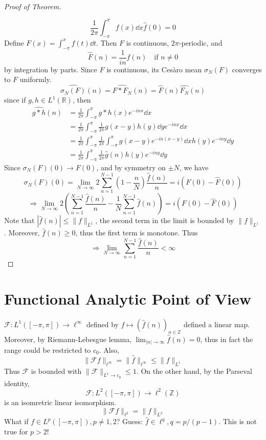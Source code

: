 \documentclass{article}
\theoremstyle{definition}
\newenvironment{proofs}[1][\proofname]{%
  \begin{proof}[#1]$ $\par\nobreak\ignorespaces
}{%
  \end{proof}
}
\newcommand{\F}{\mathcal F}
\newcommand{\RR}{\mathbb R}
\newcommand{\ZZ}{\mathbb Z}
\newcommand{\Ra}{\Rightarrow}
\begin{document}
\begin{proofs}[Proof of Theorem]
	\[
		\frac{1}{2 \pi} \int_{-\pi}^\pi f(x) \dd{x} \hat{f}(0) = 0
	\]
	Define $F(x) = \int_{-\pi}^x f(t) \dd{t}$.
	Then $F$ is continuous, $2 \pi$-periodic, and 
	\[
		\hat{F}(n) = \frac{1}{in} \hat{f}(n) \quad \text{if }n \neq 0
	\]
	by integration by parts.
	Since $F$ is continuous, its Ces\`aro mean $\sigma_N(F)$ converges to $F$ uniformly.
	\[
		\widehat{\sigma_N(F)}(n) = \widehat{F * F_N}(n) = \widehat{F}(n) \widehat{F_N}(n)
	\]
	since if $g, h \in L^1(\RR)$, then
	\[
		\begin{split}
			\widehat{g * h}(n) & = \frac{1}{2 \pi} \int_{- \pi}^\pi g * h(x) e^{-inx} \dd{x}\\
			& = \frac{1}{2 \pi} \int_{- \pi}^{\pi} \frac{1}{2 \pi} g(x - y) h(y) \dd{y} e^{-inx} \dd{x}\\
			& = \frac{1}{2 \pi} \int_{- \pi}^\pi \frac{1}{2 \pi} \int_{- \pi}^\pi g(x - y) e^{-in (x - y)} \dd{x} h(y) e^{-iny} \dd{y}\\
			& = \frac{1}{2 \pi} \int_{- \pi}^\pi \frac{1}{2 \pi} \widehat{g}(n) h(y) e^{- iny} \dd{y}
		\end{split}
	\]
	Since $\sigma_N(F)(0) \to F(0)$, and by symmetry on $\pm N$, we have
	\[
		\sigma_N(F)(0) = \lim_{N \to \infty} 2 \sum_{n = 1}^{N - 1} \left(1 - \frac{n}{N} \right) \frac{\widehat{f}(n)}{n} = i (F(0) - \widehat{F}(0))
	\]
	\[
		\Ra \lim_{N \to \infty} 2 \left( \sum_{n  = 1}^{N - 1} \frac{\widehat{f}(n)}{n} - \frac{1}{N} \sum_{n = 1}^{N - 1} \widehat{f}(n) \right) = i(F(0) - \widehat{F}(0))
	\]
	Note that $|\widehat{f}(n)| \leq \|f\|_{L^1}$, the second term in the limit is bounded by $\|f\|_{L^1}$.
	Moreover, $\hat{f}(n) \geq 0$, thus the first term is monotone.
	Thus 
	\[
		\Ra \lim_{N \to \infty} \sum_{n = 1}^{N - 1} \frac{\widehat{f}(n)}{n} < \infty
	\]

\end{proofs}

\section{Functional Analytic Point of View}

$\F: L^1([-\pi, \pi]) \to \ell^\infty$ defined by $f \mapsto (\widehat{f}(n))_{n \in \ZZ}$ defined a linear map.
Moreover, by Riemann-Lebesgue lemma, $\lim_{|n| \to \infty} \widehat{f}(n) = 0$, thus in fact the range could be restricted to $c_0$.
Also, 
\[
	\|\F f\|_{\ell^\infty} = \|\widehat{f}\|_{\ell^\infty} \leq \|f\|_{L^1}
\]
Thus $\F$ is bounded with $\|\F\|_{L^1 \to c_0} \leq 1$.
On the other hand, by the Parseval identity, 
\[
	\F: L^2([-\pi, \pi]) \to \ell^2(\ZZ)
\]
is an isomretric linear isomorphism.
\[
	\|\F f\|_{\ell^2} = \|f\|_{L^2}
\]
What if $f \in L^p([-\pi, \pi]), p \neq 1, 2$?
Guess: $\widehat{f} \in \ell^q, q = p/(p - 1)$.
This is not true for $p > 2$!
\end{document}
